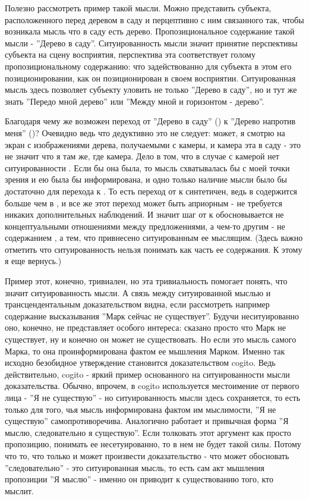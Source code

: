 \documentclass{article}
\begin{document}
Полезно рассмотреть пример такой мысли. Можно представить субъекта, расположенного перед деревом в саду и перцептивно с ним связанного так, чтобы возникала мысль что в саду есть дерево. Пропозициональное содержание такой мысли - ''Дерево в саду''. Ситуированность мысли значит принятие перспективы субъекта на сцену восприятия, перспектива эта соответствует голому пропозициональному содержанию: что задействованно для субъекта в этом его позиционировании, как он позиционирован в своем восприятии. Ситуированная мысль здесь позволяет субъекту уловить не только ''Дерево в саду'', но и тут же знать ''Передо мной дерево'' или ''Между мной и горизонтом - дерево''.

Благодаря чему же возможен переход от ''Дерево в саду'' () к ''Дерево напротив меня'' ()? Очевидно ведь что дедуктивно это не следует: может, я смотрю на экран с изображениями дерева, получаемыми с камеры, и камера эта в саду - это не значит что я там же, где камера. Дело в том, что в случае с камерой нет ситуированности . Если бы она была, то мысль схватывалась бы с моей точки зрения и ею была бы информирована, и одно только наличие мысли было бы достаточно для перехода к . То есть переход от  к  синтетичен, ведь в  содержится больше чем в , и все же этот переход может быть априорным - не требуется никаких дополнительных наблюдений. И значит шаг от  к  обосновывается не концептуальными отношениями между предложениями, а чем-то другим - не содержанием , а тем, что привнесено ситуированным ее мыслящим. (Здесь важно отметить что ситуированность  нельзя понимать как часть ее содержания. К этому я еще вернусь.)

Пример этот, конечно, тривиален, но эта тривиальность помогает понять, что значит ситуированность мысли. А связь между ситуированной мыслью и трансцендентальным доказательством видна, если рассмотреть например содержание высказывания ''Марк сейчас не существует''. Будучи неситуированно оно, конечно, не представляет особого интереса: сказано просто что Марк не существует, ну и конечно он может не существовать. Но если это мысль самого Марка, то она проинформирована фактом ее мышления Марком. Именно так исходно безобидное утверждение становится доказательством cogito. Ведь действительно, cogito - яркий пример основанного на ситуированности мысли доказательства. Обычно, впрочем, в cogito используется местоимение от первого лица - ''Я не существую'' - но ситуированность мысли здесь сохраняется, то есть только для того, чья мысль информирована фактом им мыслимости, ''Я не существую'' самопротиворечива. Аналогично работает и привычная форма ''Я мыслю, следовательно я существую''. Если толковать этот аргумент как просто пропозицию, понимать ее несетуированно, то в нем не будет такой силы. Потому что то, что только и может произвести доказательство - что может обосновать ''следовательно'' - это ситуированная мысль, то есть сам акт мышления пропозиции ''Я мыслю'' - именно он приводит к существованию того, кто мыслит.
\end{document}
